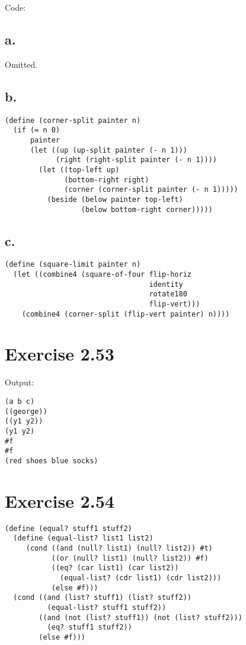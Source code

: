 \documentclass[../main.tex]{subfiles}
\begin{document}
Code:

\subsection{a.}

Omitted.

\subsection{b.}

\begin{lstlisting}
(define (corner-split painter n)
  (if (= n 0)
      painter
      (let ((up (up-split painter (- n 1)))
            (right (right-split painter (- n 1))))
        (let ((top-left up)
              (bottom-right right)
              (corner (corner-split painter (- n 1)))))
          (beside (below painter top-left)
                  (below bottom-right corner)))))
\end{lstlisting}

\subsection{c.}

\begin{lstlisting}
(define (square-limit painter n)
  (let ((combine4 (square-of-four flip-horiz
                                  identity
                                  rotate180
                                  flip-vert)))
    (combine4 (corner-split (flip-vert painter) n))))
\end{lstlisting}

\section{Exercise 2.53}

Output:

\begin{lstlisting}
(a b c)
((george))
((y1 y2))
(y1 y2)
#f
#f
(red shoes blue socks)
\end{lstlisting}

\section{Exercise 2.54}

\begin{lstlisting}
(define (equal? stuff1 stuff2)
  (define (equal-list? list1 list2)
     (cond ((and (null? list1) (null? list2)) #t)
           ((or (null? list1) (null? list2)) #f)
           ((eq? (car list1) (car list2))
             (equal-list? (cdr list1) (cdr list2)))
           (else #f)))
  (cond ((and (list? stuff1) (list? stuff2))
          (equal-list? stuff1 stuff2))
        ((and (not (list? stuff1)) (not (list? stuff2)))
          (eq? stuff1 stuff2))
        (else #f)))
\end{lstlisting}
\end{document}
